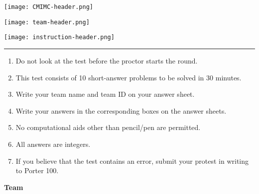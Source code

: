 \documentclass[10pt]{article}
\begin{document}
\thispagestyle{empty}
\begin{center}

\vspace*{90pt}

\texttt{[image: CMIMC-header.png]}

\texttt{[image: team-header.png]}

\vspace{1.6in}

\texttt{[image: instruction-header.png]}
\noindent\rule{17.7cm}{2pt}
\end{center}

\vspace{10pt}

\begin{enumerate}
	\large
	\item Do not look at the test before the proctor starts the round.
	\item This test consists of 10 short-answer problems to be solved in 30
		minutes.
	\item Write your team name and team ID on your answer sheet.
	\item Write your answers in the corresponding boxes on the answer
		sheets.
	\item No computational aids other than pencil/pen are permitted.
	\item All answers are integers.
	\item If you believe that the test contains an error, submit your
		protest in writing to Porter 100.
\end{enumerate}

\newpage

\begin{center}
\huge\textbf{Team}\normalsize

\vspace{3pt}
\end{center}
\end{document}
